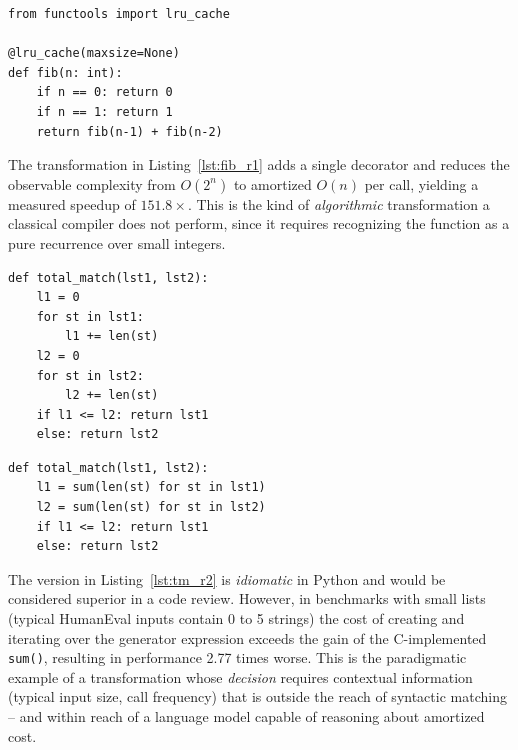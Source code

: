 \documentclass[conference]{IEEEtran}
\begin{document}
\par\medskip\noindent
\begin{minipage}{\columnwidth}
\begin{lstlisting}[caption={R1 version (\texttt{lru\_cache}) --- amortized $O(n)$.}, label={lst:fib_r1}]
from functools import lru_cache

@lru_cache(maxsize=None)
def fib(n: int):
    if n == 0: return 0
    if n == 1: return 1
    return fib(n-1) + fib(n-2)
\end{lstlisting}
\end{minipage}\par\medskip

The transformation in Listing~\ref{lst:fib_r1} adds a single decorator and reduces the observable complexity from $O(2^n)$ to amortized $O(n)$ per call, yielding a measured speedup of $151.8\times$. This is the kind of \emph{algorithmic} transformation a classical compiler does not perform, since it requires recognizing the function as a pure recurrence over small integers.

\par\medskip\noindent
\begin{minipage}{\columnwidth}
\begin{lstlisting}[caption={Original \texttt{total\_match} (HumanEval/74).}, label={lst:tm_orig}]
def total_match(lst1, lst2):
    l1 = 0
    for st in lst1:
        l1 += len(st)
    l2 = 0
    for st in lst2:
        l2 += len(st)
    if l1 <= l2: return lst1
    else: return lst2
\end{lstlisting}
\end{minipage}\par\medskip

\par\medskip\noindent
\begin{minipage}{\columnwidth}
\begin{lstlisting}[caption={R2 version (\texttt{sum()}) --- regression $0.36\times$.}, label={lst:tm_r2}]
def total_match(lst1, lst2):
    l1 = sum(len(st) for st in lst1)
    l2 = sum(len(st) for st in lst2)
    if l1 <= l2: return lst1
    else: return lst2
\end{lstlisting}
\end{minipage}\par\medskip

The version in Listing~\ref{lst:tm_r2} is \emph{idiomatic} in Python and would be considered superior in a code review. However, in benchmarks with small lists (typical HumanEval inputs contain 0 to 5 strings) the cost of creating and iterating over the generator expression exceeds the gain of the C-implemented \texttt{sum()}, resulting in performance 2.77 times worse. This is the paradigmatic example of a transformation whose \emph{decision} requires contextual information (typical input size, call frequency) that is outside the reach of syntactic matching -- and within reach of a language model capable of reasoning about amortized cost.
\end{document}
